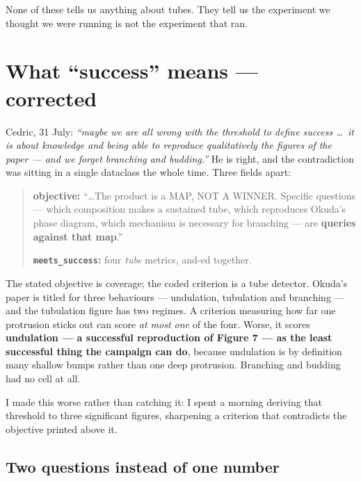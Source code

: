 \documentclass[11pt,a4paper]{article}
\newcommand{\code}[1]{\texttt{#1}}
\begin{document}
None of these tells us anything about tubes. They tell us the experiment we thought we were running
is not the experiment that ran.

\section{What ``success'' means --- corrected}\label{sec:success}

Cedric, 31 July: \emph{``maybe we are all wrong with the threshold to define success \ldots\ it
is about knowledge and being able to reproduce qualitatively the figures of the paper --- and we
forget branching and budding.''} He is right, and the contradiction was sitting in a single
dataclass the whole time. Three fields apart:

\begin{quote}\small
\textbf{objective:} ``\ldots The product is a MAP, NOT A WINNER. Specific questions --- which
composition makes a sustained tube, which reproduces Okuda's phase diagram, which mechanism is
necessary for branching --- are \textbf{queries against that map}.''

\textbf{\code{meets\_success}:} four \emph{tube} metrics, and-ed together.
\end{quote}

The stated objective is coverage; the coded criterion is a tube detector. Okuda's paper is titled
for three behaviours --- undulation, tubulation and branching --- and the tubulation figure has two
regimes. A criterion measuring how far one protrusion sticks out can score \emph{at most one} of
the four. Worse, it scores \textbf{undulation --- a successful reproduction of Figure 7 --- as the
least successful thing the campaign can do}, because undulation is by definition many shallow
bumps rather than one deep protrusion. Branching and budding had no cell at all.

I made this worse rather than catching it: I spent a morning deriving that threshold to three
significant figures, sharpening a criterion that contradicts the objective printed above it.

\subsection*{Two questions instead of one number}
\end{document}
